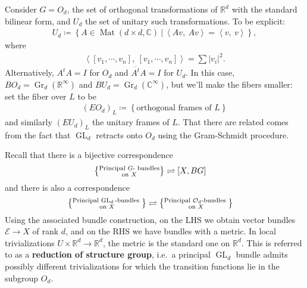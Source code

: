 \begin{example}[?]

Consider \(G = O_d\), the set of orthogonal transformations of
\({\mathbb{R}}^d\) with the standard bilinear form, and \(U_d\) the set
of unitary such transformations. To be explicit:
\begin{align*}
U_d \coloneqq\left\{{ A \in \operatorname{Mat}(d \times d, {\mathbb{C}}) {~\mathrel{\Big|}~}{\left\langle {Av},~{Av} \right\rangle} = {\left\langle {v},~{v} \right\rangle} }\right\}
,\end{align*}
where
\begin{align*}
{\left\langle { {\left[ {v_1, \cdots, v_n} \right]}},~{{\left[ {v_1, \cdots, v_n } \right]} } \right\rangle} = \sum {\left\lvert {v_i} \right\rvert}^2
.\end{align*}
Alternatively, \(A^t A = I\) for \(O_d\) and
\({\overline{{A^t}}} A = I\) for \(U_d\). In this case,
\(BO_d = {\operatorname{Gr}}_d( {\mathbb{R}}^{\infty } )\) and
\(BU_d = {\operatorname{Gr}}_d( {\mathbb{C}}^{ \infty })\), but we'll
make the fibers smaller: set the fiber over \(L\) to be
\begin{align*}
(EO_d)_L \coloneqq\left\{{ \text{orthogonal frames of } L }\right\}
\end{align*}
and similarly \((EU_d)_L\) the unitary frames of \(L\). That there are
related comes from the fact that \(\operatorname{GL}_d\) retracts onto
\(O_d\) using the Gram-Schmidt procedure.

\end{example}

\begin{remark}

Recall that there is a bijective correspondence
\begin{align*}
\left\{{\substack{
  \text{Principal $G{\hbox{-}}$ bundles}
  \\ \text{on } X
}}\right\}
&\rightleftharpoons
  [X, BG]
\end{align*}
and there is also a correspondence
\begin{align*}
\left\{{\substack{
  \text{Principal $\operatorname{GL}_d{\hbox{-}}$bundles }\\
  \text{on } X
}}\right\}
&\rightleftharpoons
\left\{{\substack{
  \text{Principal ${\mathcal{O}}_d{\hbox{-}}$bundles } \\
  \text{on } X
}}\right\}
\end{align*}
Using the associated bundle construction, on the LHS we obtain vector
bundles \(\mathcal{E}\to X\) of rank \(d\), and on the RHS we have
bundles with a metric. In local trivializations
\(U \times{\mathbb{R}}^d \to {\mathbb{R}}^d\), the metric is the
standard one on \({\mathbb{R}}^d\). This is referred to as a
\textbf{reduction of structure group}, i.e.~a principal
\(\operatorname{GL}_d\) bundle admits possibly different trivializations
for which the transition functions lie in the subgroup \(O_d\).

\end{remark}

